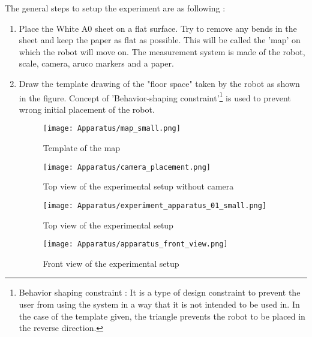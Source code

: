The general steps to setup the experiment are as following :
\begin{enumerate}
    \item
    Place the White A0 sheet on a flat surface.  Try to remove any bends in the sheet and keep the paper as flat as possible. This will be called the 'map' on which the robot will move on. The measurement system is made of the robot, scale, camera, aruco markers and a paper. 
    \item
    Draw the template drawing of the "floor space" taken by the robot as shown in the figure. Concept of 'Behavior-shaping constraint'\footnote{Behavior shaping constraint : It is a type of design constraint to prevent the user from using the system in a way that it is not intended to be used in. In the case of the template given, the triangle prevents the robot to be placed in the reverse direction.} is used to prevent wrong initial placement of the robot.
    
    
    \begin{figure}[H]
	\centering
    \texttt{[image: Apparatus/map\_small.png]}
    \caption{ Template of the map}
    \end{figure}    
      
    \begin{figure}[H]
    	\centering
    	\texttt{[image: Apparatus/camera\_placement.png]}
    	\caption{Top view of the experimental setup without camera}
    \end{figure}
    
    \begin{figure}[H]
    	\centering
    	\texttt{[image: Apparatus/experiment\_apparatus\_01\_small.png]}
    	\caption{Top view of the experimental setup}
    \end{figure}
    
    \begin{figure}[H]
     	\centering
     	\texttt{[image: Apparatus/apparatus\_front\_view.png]}
     	\caption{Front view of the experimental setup}
    \end{figure}
    

\end{enumerate}
